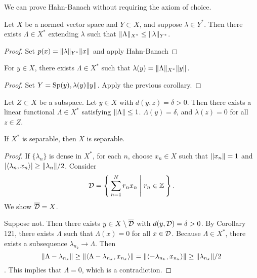 \documentclass[10pt, twoside]{article}
\begin{document}
    \begin{rmk}
        We can prove Hahn-Banach without requiring the axiom of choice. 
    \end{rmk}

    \begin{cor}
        Let $X$ be a normed vector space and $Y \subset X$, and suppose $\lambda \in Y^*$.  Then there exists $\Lambda \in X^*$ extending $\lambda$ such that $\lVert\Lambda\rVert_{X^*} \leq \lVert\lambda\rVert_{Y^*}$.
        \begin{proof}
            Set $p(x) = \lVert\lambda\rVert_{Y^*} \lVert x\rVert$ and apply Hahn-Banach
        \end{proof}
    \end{cor}

    \begin{cor}
        For $y \in X$, there exists $\Lambda \in X^*$ such that $\lambda(y) = \lVert\Lambda\rVert_{X^*} \lVert y\rVert$. 
        \begin{proof}
            Set $Y = \mathrm{Sp}(y), \lambda(y) \lVert y\rVert$. Apply the previous corollary.
        \end{proof}
    \end{cor}

    \begin{cor}
        Let $Z \subset X$ be a subspace. Let $y \in X$ with $d(y,z) = \delta > 0$. Then there exists a linear functional $\Lambda \in X^*$ satisfying $\lVert\Lambda\rVert \leq 1$. $\Lambda(y) = \delta$, and $\lambda(z) = 0$ for all $z \in Z$.
    \end{cor}

    \begin{thm}
        If $X^*$ is separable, then $X$ is separable.
        \begin{proof}
            If $\{\lambda_n\}$ is dense in $X^*$, for each $n$, choose $x_n \in X$ such that $\lVert x_n\rVert = 1$ and $\lvert\langle\lambda_n, x_n\rangle\rvert \geq \lVert\lambda_n\rVert/2$. Consider \[\mathcal{D} = \Set{\sum_{n=1}^N r_nx_n | r_n \in \mathbb{Z}}. \] We show $\overline{\mathcal{D}} = X$.

            Suppose not. Then there exists $y \in X \setminus \overline{\mathcal{D}}$ with $d(y, \mathcal{D}) = \delta > 0$. By Corollary 121, there exists $\Lambda$ such that $\Lambda(x) = 0$ for all $x \in \mathcal{D}$. Because $\Lambda \in X^*$, there exists a subsequence $\lambda_{n_k} \to \Lambda$. Then \[\lVert\Lambda - \lambda_{n_k}\rVert \geq \lVert\langle\Lambda - \lambda_{n_k}, x_{n_k}\rangle\rVert = \lVert\langle-\lambda_{n_k}, x_{n_k}\rangle\rVert \geq \lVert\lambda_{n_k}\rVert/2\]. This implies that $\Lambda = 0$, which is a contradiction.
        \end{proof}
    \end{thm}
\end{document}
